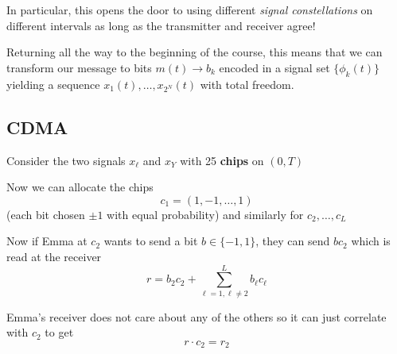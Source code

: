 \documentclass[12pt]{report}
\newcommand*{\tbf}[1]{\ifmmode\mathbf{#1}\else\textbf{#1}\fi}
\begin{document}
In particular, this opens the door to using different \emph{signal constellations} on different intervals as long as the transmitter and receiver agree! 

Returning all the way to the beginning of the course, this means that we can transform our message to bits $m(t) \to b_k$ encoded in a signal set $\{\phi_k(t)\}$ yielding a sequence $x_1(t), \dots, x_{2^N}(t)$ with total freedom. 

\subsection{CDMA}
Consider the two signals $x_{\ell}$ and $x_Y$ with 25 \tbf{chips} on $(0, T)$ 

\begin{center}
\end{center}

Now we can allocate the chips 
\[c_1 = (1, -1, \dots, 1)\]
(each bit chosen $\pm 1$ with equal probability)
and similarly for $c_2, \dots, c_L$

Now if Emma at $c_2$ wants to send a bit $b \in \{-1, 1\}$, they can send $b c_2$ which is read at the receiver 
\[r = b_2 c_2 + \sum_{\ell = 1, \ell \neq 2}^L b_{\ell} c_{\ell}\]

Emma's receiver does not care about any of the others so it can just correlate with $c_2$ to get 
\[r \cdot c_2 = r_2\]
\end{document}

